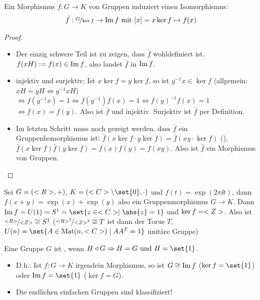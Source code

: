 \begin{proposition}
	Ein Morphismus $f: G \to K$ von Gruppen induziert einen Isomorphismus:
	\begin{align*}
		\bar{f}: \lnkset{G}{\ker f} \to \Image f \mit [x] = x \ker f \mapsto f(x)
	\end{align*}
\end{proposition}
\begin{proof} %
	\begin{itemize}
	\item Der einzig schwere Teil ist zu zeigen, dass $\bar{f}$ wohldefiniert ist. $f(xH) := f(x) \in \operatorname{Im} f$, also landet $\bar{f}$ in $\operatorname{Im} f$.
	\item injektiv und surjektiv: Ist $x \ker f = y \ker f$, so ist $y^{-1}x \in \ker f$ (allgemein: $xH = yH \Leftrightarrow y^{-1}xH$) $\Leftrightarrow f(y^{-1}x) = 1 \Leftrightarrow f(y^{-1})f(x) = 1 \Leftrightarrow f(y)^{-1}f(x) = 1$ $\Leftrightarrow f(x) = f(y)$. Also ist $\bar{f}$ und injektiv. Surjektiv ist $\bar{f}$ per Definition.
	\item Im letzten Schritt muss noch gezeigt werden, dass $\bar{f}$ ein Gruppenhomorphismus ist: $\bar{f}(x \ker f \cdot y \ker f) = \bar{f}(xy \cdot \ker f)$ (). $\bar{f}(x \ker f)\bar{f}(y\ker f) = f(x)f(y) = f(xy)$. Also ist $\bar{f}$ ein Morphismus von Gruppen.
	\end{itemize}
\end{proof}
\begin{example}
	Sei $G = (<R>, +)$, $K = (\C\setminus \set{0},\cdot)$ und $f(t) = \exp(2\pi \ii t)$, dann $f(x+y) = \exp(x) + \exp(y)$ also ein Gruppenmorphismus $G \to K$. Dann $\Image f = U(1) = S^1 = \set{z \in \C \mid \abs{z} = 1}$ und $\ker f = <Z>$. Also ist $\lnkset{\R}{\Z} \cong S^1$ ($\lnkset{\R^2}{\Z^2} \cong T$ ist dann der Torus $T$, $U(n) = \set{A \in \Mat(n, \C) \mid AA^T = 1}$ unitäre Gruppe)
\end{example}
\begin{definition}
	Eine Gruppe $G$ ist , wenn $H \lhd G \implies H = G \und H = \set{1}$.
\end{definition}
\begin{*remark}
	\begin{itemize}
	\item D.h.: Ist $f: G \to K$ irgendein Morphismus, so ist $G \cong \operatorname{Im} f$ ($\ker f = \set{1}$) oder $\Image f = \set{1}$ ($\ker f = G$).
	\item Die endlichen einfachen Gruppen sind klassifiziert! 
	\end{itemize}
\end{*remark}
